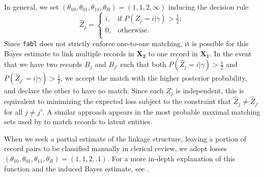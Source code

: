 \documentclass[ba]{imsart}
\begin{document}
In general, we set $(\theta_{10}, \theta_{01}, \theta_{11}, \theta_R) = (1, 1, 2, \infty)$ inducing the decision rule
	$$\hat{Z}_j =\begin{cases} 
		i,  & \text{if } P(Z_j = i |\gamma) > \frac{1}{2}; \\
		0,  & \text{otherwise}. \\
	\end{cases}$$
Since \texttt{fabl} does not strictly enforce one-to-one matching, it is possible for this Bayes estimate to link multiple records in $\bm{X_2}$ to one record in $\bm{X_1}$. In the event that we have two records $B_j$ and $B_{j'}$ such that both $P(\hat{Z}_j = i |\gamma) > \frac{1}{2}$ and $ P(\hat{Z}_{j'} = i |\gamma) > \frac{1}{2}$, we accept the match with the higher posterior probability, and declare the other to have no match. Since each $Z_j$ is independent, this is equivalent to minimizing the expected loss subject to the constraint that $\hat{Z}_j \neq \hat{Z}_{j'}$ for all $j \neq j'$.  A similar approach appears in the most probable maximal matching sets used by \cite{steorts_bayesian_2016} to match records to latent entities.

When we seek a partial estimate of the linkage structure, leaving a portion of record pairs to be classified manually in clerical review, we adopt losses $(\theta_{10}, \theta_{01}, \theta_{11}, \theta_R) = (1, 1, 2, .1)$. For a more in-depth explanation of this function and the induced Bayes estimate, see \cite{sadinle_bayesian_2017}.
	
\end{document}
